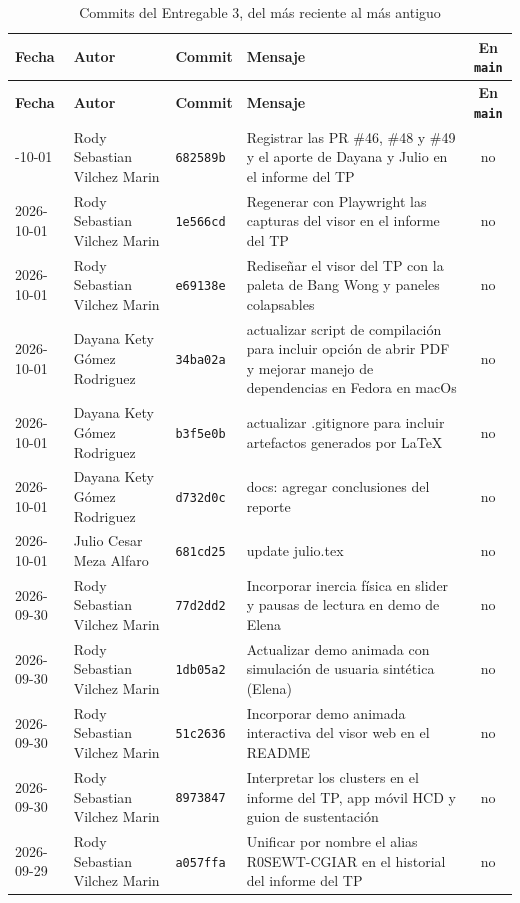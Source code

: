 {\small
\begin{xltabular}{\textwidth}{@{}L{1.9cm}L{2.7cm}L{1.4cm}Yc@{}}
\caption{Commits del Entregable 3, del más reciente al más antiguo}\label{tab:commits}\\
\toprule
\textbf{Fecha} & \textbf{Autor} & \textbf{Commit} & \textbf{Mensaje} & \textbf{En \texttt{main}} \\
\midrule
\endfirsthead
\toprule
\textbf{Fecha} & \textbf{Autor} & \textbf{Commit} & \textbf{Mensaje} & \textbf{En \texttt{main}} \\
\midrule
\endhead
\bottomrule
{}-10-01 & Rody Sebastian Vilchez Marin & \texttt{682589b} & Registrar las PR \#46, \#48 y \#49 y el aporte de Dayana y Julio en el informe del TP & no \\
2026-10-01 & Rody Sebastian Vilchez Marin & \texttt{1e566cd} & Regenerar con Playwright las capturas del visor en el informe del TP & no \\
2026-10-01 & Rody Sebastian Vilchez Marin & \texttt{e69138e} & Rediseñar el visor del TP con la paleta de Bang Wong y paneles colapsables & no \\
2026-10-01 & Dayana Kety Gómez Rodriguez & \texttt{34ba02a} & actualizar script de compilación para incluir opción de abrir PDF y mejorar manejo de dependencias en Fedora en macOs & no \\
2026-10-01 & Dayana Kety Gómez Rodriguez & \texttt{b3f5e0b} & actualizar .gitignore para incluir artefactos generados por LaTeX & no \\
2026-10-01 & Dayana Kety Gómez Rodriguez & \texttt{d732d0c} & docs: agregar conclusiones del reporte & no \\
2026-10-01 & Julio Cesar Meza Alfaro & \texttt{681cd25} & update julio.tex & no \\
2026-09-30 & Rody Sebastian Vilchez Marin & \texttt{77d2dd2} & Incorporar inercia física en slider y pausas de lectura en demo de Elena & no \\
2026-09-30 & Rody Sebastian Vilchez Marin & \texttt{1db05a2} & Actualizar demo animada con simulación de usuaria sintética (Elena) & no \\
2026-09-30 & Rody Sebastian Vilchez Marin & \texttt{51c2636} & Incorporar demo animada interactiva del visor web en el README & no \\
2026-09-30 & Rody Sebastian Vilchez Marin & \texttt{8973847} & Interpretar los clusters en el informe del TP, app móvil HCD y guion de sustentación & no \\
2026-09-29 & Rody Sebastian Vilchez Marin & \texttt{a057ffa} & Unificar por nombre el alias R0SEWT-CGIAR en el historial del informe del TP & no \\

\end{xltabular}}
